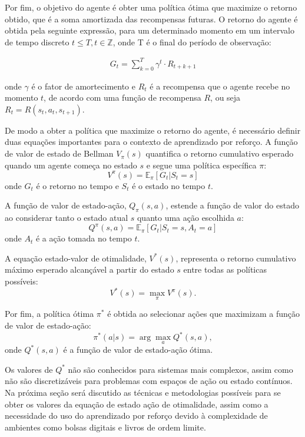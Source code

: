 Por fim, o objetivo do agente é obter uma política ótima que maximize o retorno obtido, que é a soma amortizada das recompensas futuras. O retorno do agente é obtida pela seguinte expressão, para um determinado momento em um intervalo de tempo discreto $t \leq T, t \in \mathbb{Z}$, onde T é o final do período de observação:

\begin{equation}
	\begin{aligned}
		G_{t} = \sum_{k=0}^{T} \gamma^t \cdot R_{t + k + 1}
	\end{aligned}
\end{equation}

onde $\gamma$ é o fator de amortecimento e $R_t$ é a recompensa que o agente recebe no momento $t$, de acordo com uma função de recompensa $R$, ou seja $R_t = R(s_{t}, a_{t}, s_{t + 1})$.

De modo a obter a política que maximize o retorno do agente, é necessário definir duas equações importantes para o contexto de aprendizado por reforço. A função de valor de estado de Bellman \(V_\pi(s)\) quantifica o retorno cumulativo esperado quando um agente começa no estado \(s\) e segue uma política específica \(\pi\):
\[ 
V^{\pi}(s) = \mathbb{E}_\pi[G_t | S_t = s]
\]
onde \(G_t\) é o retorno no tempo e \(S_t\) é o estado no tempo \(t\).

A função de valor de estado-ação, \(Q_\pi(s, a)\), estende a função de valor do estado ao considerar tanto o estado atual \(s\) quanto uma ação escolhida \(a\):
\[ Q^{\pi}(s, a) = \mathbb{E}_\pi[G_t | S_t = s, A_t = a]\]
onde \(A_t\) é a ação tomada no tempo \(t\).

A equação estado-valor de otimalidade, \(V^*(s)\), representa o retorno cumulativo máximo esperado alcançável a partir do estado \(s\) entre todas as políticas possíveis:
\[ V^*(s) = \max_\pi V^{\pi}(s). \]

Por fim, a política ótima $\pi^*$ é obtida ao selecionar ações que maximizam a função de valor de estado-ação:
\[ \pi^*(a|s) = \arg\max_a Q^*(s, a), \]
onde \(Q^*(s, a)\) é a função de valor de estado-ação ótima.

Os valores de $Q^{*}$ não são conhecidos para sistemas mais complexos, assim como não são discretizáveis para problemas com espaços de ação ou estado contínuos. Na próxima seção será discutido as técnicas e metodologias possíveis para se obter os valores da equação de estado ação de otimalidade, assim como a necessidade do uso do aprendizado por reforço devido à complexidade de ambientes como bolsas digitais e livros de ordem limite.
